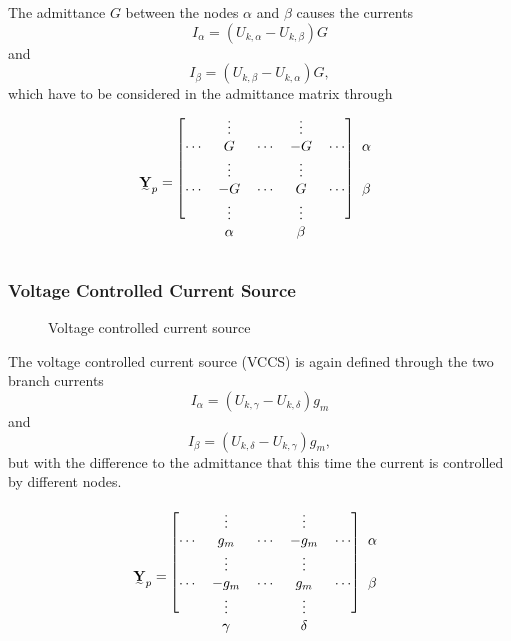 The admittance $G$ between the nodes $\alpha$ and $\beta$  causes the currents
\begin{equation}
	I_\alpha = (U_{k,\alpha} - U_{k,\beta}) G
\end{equation}
and
\begin{equation}
	I_\beta = (U_{k,\beta} - U_{k,\alpha}) G,
\end{equation}
which have to be considered in the admittance matrix through
\begin{equation}
	\mat Y_p = 	
	\begin{blockarray}{cccccc}
		\begin{block}{[ccccc]c}
		 		& \vdots	&			& \vdots	&			& \\
		\cdots	& G			& \cdots	& -G		& \cdots	& \alpha \\
		 		& \vdots	&			& \vdots	&			& \\
		\cdots	& -G		& \cdots	& G			& \cdots	& \beta \\
		 		& \vdots	&			& \vdots	&			& \\
		\end{block}
				& \alpha	&			& \beta		&			& 
	\end{blockarray}
\end{equation}

\subsubsection{Voltage Controlled Current Source}

\begin{figure}
	\centering
	
	\caption{Voltage controlled current source}
	\label{fig:voltage_controlled_current_source}
\end{figure}

The voltage controlled current source (VCCS) is again defined through the two branch currents
\begin{equation}
	I_\alpha = (U_{k,\gamma} - U_{k,\delta}) g_m
\end{equation}
and
\begin{equation}
	I_\beta = (U_{k,\delta} - U_{k,\gamma}) g_m,
\end{equation}
but with the difference to the admittance that this time the current is controlled by different nodes.

\begin{equation}
	\mat Y_p = 	
	\begin{blockarray}{cccccc}
		\begin{block}{[ccccc]c}
		 		& \vdots	&			& \vdots	&			& \\
		\cdots	& g_m		& \cdots	& -g_m		& \cdots	& \alpha \\
		 		& \vdots	&			& \vdots	&			& \\
		\cdots	& -g_m		& \cdots	& g_m		& \cdots	& \beta \\
		 		& \vdots	&			& \vdots	&			& \\
		\end{block}
				& \gamma	&			& \delta	&			& 
	\end{blockarray}
\end{equation}

